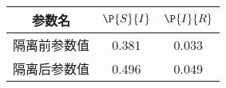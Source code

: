 \begin{tabular}{ccc}
\hline
参数名&$\P{S}{I}$&$\P{I}{R}$\\
\hline
隔离前参数值&0.381&0.033\\
隔离后参数值&0.496&0.049\\
\hline
\end{tabular}